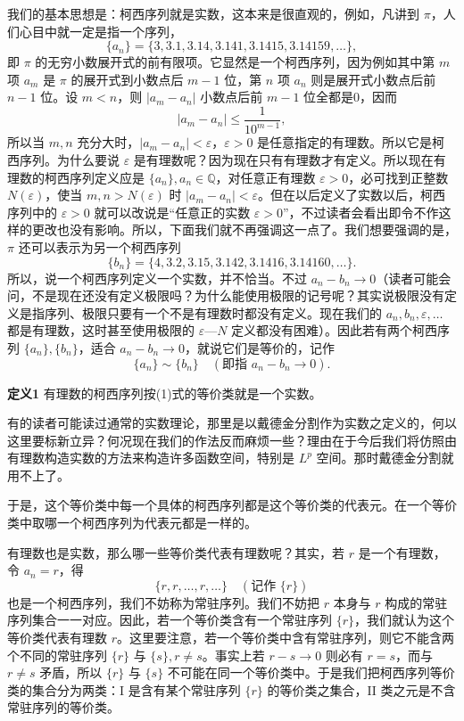 我们的基本思想是：柯西序列就是实数，这本来是很直观的，例如，凡讲到 $\pi$，人们心目中就一定是指一个序列，
\[
 \{a_n\}=\{3,3.1,3.14,3.141,3.1415,3.14159,\ldots\},
\]
即 $\pi$ 的无穷小数展开式的前有限项。它显然是一个柯西序列，因为例如其中第 $m$ 项 $a_m$ 是 $\pi$ 的展开式到小数点后 $m-1$ 位，第 $n$ 项 $a_n$ 则是展开式小数点后前 $n-1$ 位。设 $m<n$，则 $|a_m-a_n|$ 小数点后前 $m-1$ 位全都是0，因而
\[
 |a_m-a_n|\le \frac1{10^{m-1}},
\]
所以当 $m,n$ 充分大时，$|a_m-a_n|<\varepsilon$，$\varepsilon>0$ 是任意指定的有理数。所以它是柯西序列。为什么要说 $\varepsilon$ 是有理数呢？因为现在只有有理数才有定义。所以现在有理数的柯西序列定义应是 $\{a_n\},a_n\in\mathbb Q$，对任意正有理数 $\varepsilon>0$，必可找到正整数 $N(\varepsilon)$，使当 $m,n>N(\varepsilon)$ 时 $|a_m-a_n|<\varepsilon$。但在以后定义了实数以后，柯西序列中的 $\varepsilon>0$ 就可以改说是“任意正的实数 $\varepsilon>0$”，不过读者会看出即令不作这样的更改也没有影响。所以，下面我们就不再强调这一点了。我们想要强调的是，$\pi$ 还可以表示为另一个柯西序列
\[
 \{b_n\}=\{4,3.2,3.15,3.142,3.1416,3.14160,\ldots\}.
\]
所以，说一个柯西序列定义一个实数，并不恰当。不过 $a_n-b_n\to0$（读者可能会问，不是现在还没有定义极限吗？为什么能使用极限的记号呢？其实说极限没有定义是指序列、极限只要有一个不是有理数时都没有定义。现在我们的 $a_n,b_n,\varepsilon,\ldots$ 都是有理数，这时甚至使用极限的 $\varepsilon$—$N$ 定义都没有困难）。因此若有两个柯西序列 $\{a_n\},\{b_n\}$，适合 $a_n-b_n\to0$，就说它们是等价的，记作
\begin{equation}
 \{a_n\}\sim\{b_n\}\quad(\text{即指 }a_n-b_n\to0).
 \tag{1}
\end{equation}

\noindent\textbf{定义1}\quad
有理数的柯西序列按(1)式的等价类就是一个实数。

有的读者可能读过通常的实数理论，那里是以戴德金分割作为实数之定义的，何以这里要标新立异？何况现在我们的作法反而麻烦一些？理由在于今后我们将仿照由有理数构造实数的方法来构造许多函数空间，特别是 $L^p$ 空间。那时戴德金分割就用不上了。

于是，这个等价类中每一个具体的柯西序列都是这个等价类的代表元。在一个等价类中取哪一个柯西序列为代表元都是一样的。

有理数也是实数，那么哪一些等价类代表有理数呢？其实，若 $r$ 是一个有理数，令 $a_n=r$，得
\[
 \{r,r,\ldots,r,\ldots\}\quad(\text{记作 }\{r\})
\]
也是一个柯西序列，我们不妨称为常驻序列。我们不妨把 $r$ 本身与 $r$ 构成的常驻序列集合一一对应。因此，若一个等价类含有一个常驻序列 $\{r\}$，我们就认为这个等价类代表有理数 $r$。这里要注意，若一个等价类中含有常驻序列，则它不能含两个不同的常驻序列 $\{r\}$ 与 $\{s\},r\ne s$。事实上若 $r-s\to0$ 则必有 $r=s$，而与 $r\ne s$ 矛盾，所以 $\{r\}$ 与 $\{s\}$ 不可能在同一个等价类中。于是我们把柯西序列等价类的集合分为两类：I 是含有某个常驻序列 $\{r\}$ 的等价类之集合，II 类之元是不含常驻序列的等价类。

